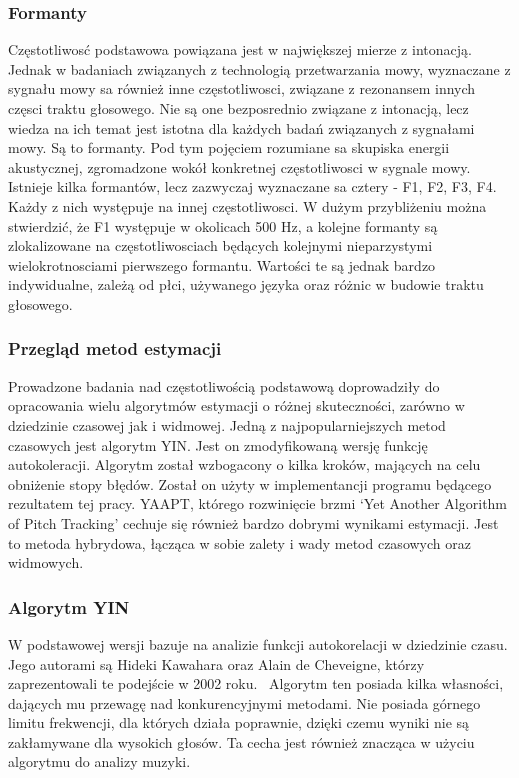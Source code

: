 \documentclass[a4paper,12 pt]{article}
\begin{document}
\subsubsection{Formanty}
Częstotliwosć podstawowa powiązana jest w największej mierze z intonacją. Jednak w badaniach związanych z technologią przetwarzania mowy, wyznaczane z sygnału mowy sa również inne częstotliwosci, związane z rezonansem innych częsci traktu głosowego. Nie są one bezposrednio związane z intonacją, lecz wiedza na ich temat jest istotna dla każdych badań związanych z sygnałami mowy. Są to formanty. Pod tym pojęciem rozumiane sa skupiska energii akustycznej, zgromadzone wokół konkretnej częstotliwosci w sygnale mowy.~\cite{formant} Istnieje kilka formantów, lecz zazwyczaj wyznaczane sa cztery - F1, F2, F3, F4. Każdy z nich występuje na innej częstotliwosci. W dużym przybliżeniu można stwierdzić, że F1 występuje w okolicach 500 Hz, a kolejne formanty są zlokalizowane na częstotliwosciach będących kolejnymi nieparzystymi wielokrotnosciami pierwszego formantu. Wartości te są jednak bardzo indywidualne, zależą od płci, używanego języka oraz różnic w budowie traktu głosowego.
\subsubsection{Przegląd metod estymacji}
Prowadzone badania nad częstotliwością podstawową doprowadziły do opracowania wielu algorytmów estymacji o różnej skuteczności, zarówno w dziedzinie czasowej jak i widmowej.
Jedną z najpopularniejszych metod czasowych jest algorytm YIN. Jest on zmodyfikowaną wersję funkcję autokoleracji. Algorytm został wzbogacony o kilka kroków, mających na celu obniżenie stopy błędów. Został on użyty w implementancji programu będącego rezultatem tej pracy.
YAAPT, którego rozwinięcie brzmi `Yet Another Algorithm of Pitch Tracking'  cechuje się również bardzo dobrymi wynikami estymacji. Jest to metoda hybrydowa, łącząca w sobie zalety i wady metod czasowych oraz widmowych.
 
\subsubsection{Algorytm YIN}

W podstawowej wersji bazuje na analizie funkcji autokorelacji w dziedzinie czasu. Jego autorami są Hideki Kawahara oraz Alain de Cheveigne, którzy zaprezentowali te podejście w 2002 roku.~\cite{YIN} Algorytm ten posiada kilka własności, dających mu przewagę nad konkurencyjnymi metodami. Nie posiada górnego limitu frekwencji, dla których działa poprawnie, dzięki czemu wyniki nie są zakłamywane dla wysokich głosów. Ta cecha jest również znacząca w użyciu algorytmu do analizy muzyki. 
\end{document}
